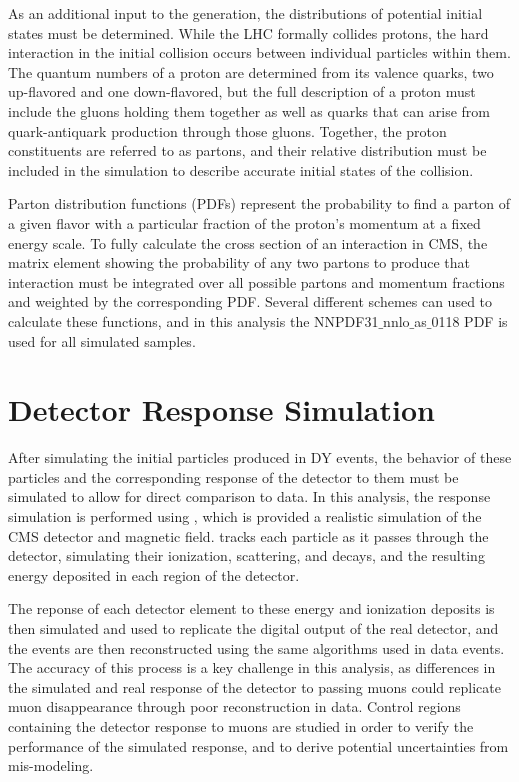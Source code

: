 As an additional input to the generation, the distributions of potential initial states must be determined.
While the LHC formally collides protons, the hard interaction in the initial collision occurs between individual particles within them.
The quantum numbers of a proton are determined from its valence quarks, two up-flavored and one down-flavored, but the full description of a proton must include the gluons holding them together as well as quarks that can arise from quark-antiquark production through those gluons. 
Together, the proton constituents are referred to as partons, and their relative distribution must be included in the simulation to describe accurate initial states of the collision.

Parton distribution functions (PDFs) represent the probability to find a parton of a given flavor with a particular fraction of the proton's momentum at a fixed energy scale.
To fully calculate the cross section of an interaction in CMS, the matrix element showing the probability of any two partons to produce that interaction must be integrated over all possible partons and momentum fractions and weighted by the corresponding PDF. 
Several different schemes can used to calculate these functions, and in this analysis the NNPDF31$\_$nnlo$\_$as$\_$0118 PDF \cite{nnpdf} is used for all simulated samples.

\section{Detector Response Simulation}

After simulating the initial particles produced in DY events, the behavior of these particles and the corresponding response of the detector to them must be simulated to allow for direct comparison to data.
In this analysis, the response simulation is performed using \geant \cite{geantRef}, which is provided a realistic simulation of the CMS detector and magnetic field.
\geant tracks each particle as it passes through the detector, simulating their ionization, scattering, and decays, and the resulting energy deposited in each region of the detector.

The reponse of each detector element to these energy and ionization deposits is then simulated and used to replicate the digital output of the real detector, and the events are then reconstructed using the same algorithms used in data events.
The accuracy of this process is a key challenge in this analysis, as differences in the simulated and real response of the detector to passing muons could replicate muon disappearance through poor reconstruction in data. 
Control regions containing the detector response to muons are studied in order to verify the performance of the simulated response, and to derive potential uncertainties from mis-modeling.

